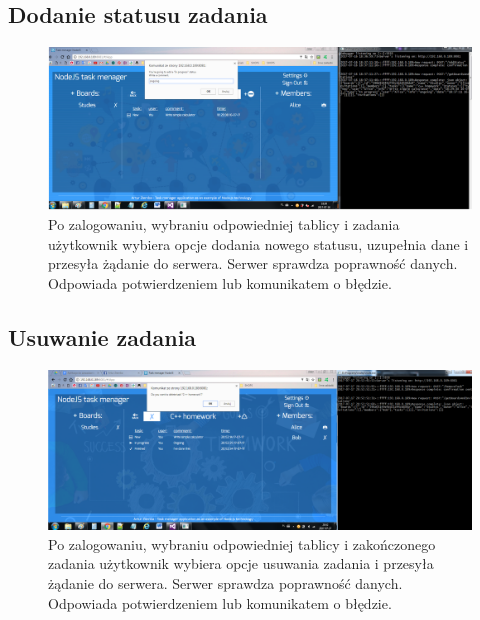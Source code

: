 \documentclass[12pt]{report}
\begin{document}
\subsection{Dodanie statusu zadania}
\begin{figure}[!hb]
\centering
\includegraphics[width=\textwidth,height=\textheight,keepaspectratio]{B2.png}
\captionsetup{labelformat=empty}
\caption[]{Po zalogowaniu, wybraniu odpowiedniej tablicy i zadania użytkownik wybiera opcje dodania nowego statusu, uzupełnia dane i przesyła żądanie do serwera. 
Serwer sprawdza poprawność danych. Odpowiada potwierdzeniem lub komunikatem o błędzie.}
\end{figure}

\subsection{Usuwanie zadania}
\begin{figure}[!hb]
\centering
\includegraphics[width=\textwidth,height=\textheight,keepaspectratio]{C2.png}
\captionsetup{labelformat=empty}
\caption[]{Po zalogowaniu, wybraniu odpowiedniej tablicy i zakończonego zadania użytkownik wybiera opcje usuwania zadania i przesyła żądanie do serwera. 
Serwer sprawdza poprawność danych. Odpowiada potwierdzeniem lub komunikatem o błędzie.}
\end{figure}

\newpage 
\end{document}
